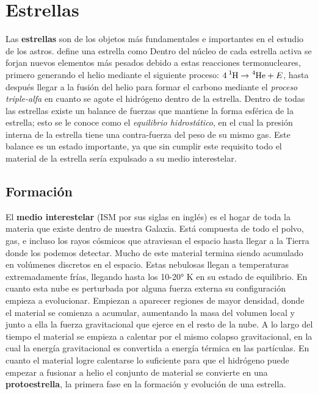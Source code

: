 \section{Estrellas}

Las \textbf{estrellas} son de los objetos más fundamentales e importantes en el
estudio de los astros. \citet*{anIntroStellarAstro::chapter1_basicConcepts}
define una estrella como  Dentro del núcleo de cada estrella activa se forjan nuevos elementos
más pesados debido a estas reacciones termonucleares, primero generando el helio
mediante el siguiente proceso: $\ce{4 ^1H} \rightarrow \ce{^4He} + E$, hasta después
llegar a la fusión del helio para formar el carbono mediante el \textit{proceso
triple-alfa} en cuanto se agote el hidrógeno dentro de la estrella. Dentro de
todas las estrellas existe un balance de fuerzas que mantiene la forma esférica
de la estrella; esto se le conoce como el \textit{equilibrio hidrostático}, en
el cual la presión interna de la estrella tiene una contra-fuerza del peso de su
mismo gas. Este balance es un estado importante, ya que sin cumplir este
requisito todo el material de la estrella sería expulsado a su medio
interestelar.

\subsection{Formación}


El \textbf{medio interestelar} (ISM por sus siglas en inglés) es el hogar de
toda la materia que existe dentro de nuestra Galaxia. Está compuesta de todo el
polvo, gas, e incluso los rayos cósmicos que atraviesan el espacio hasta llegar
a la Tierra donde los podemos detectar. Mucho de este material termina siendo
acumulado en volúmenes discretos en el espacio. Estas nebulosas llegan a
temperaturas extremadamente frías, llegando hasta los 10-20° K en su estado de
equilibrio. En cuanto esta nube es perturbada por alguna fuerza externa su
configuración empieza a evolucionar. Empiezan a aparecer regiones de mayor
densidad, donde el material se comienza a acumular, aumentando la masa del
volumen local y junto a ella la fuerza gravitacional que ejerce en el resto de
la nube. A lo largo del tiempo el material se empieza a calentar por el mismo
colapso gravitacional, en la cual la energía gravitacional es convertida a
energía térmica en las partículas. En cuanto el material logre calentarse lo
suficiente para que el hidrógeno puede empezar a fusionar a helio el conjunto de
material se convierte en una \textbf{protoestrella}, la primera fase en la
formación y evolución de una estrella.

